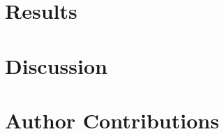 \documentclass[orange]{enslyonstage}
\begin{document}
\section{Results}
\label{sec:results}
%
%

\subsection{}


\section{Discussion}
\label{sec:discussion}
%

\paragraph{}


\section*{Author Contributions}
%
\end{document}
